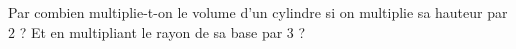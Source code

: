 
\begin{exercice}\label{exoSeconde-0092}

    Par combien multiplie-t-on le volume d'un cylindre si on multiplie sa hauteur par \( 2\) ? Et en multipliant le rayon de sa base par \( 3\) ?

\end{exercice}
